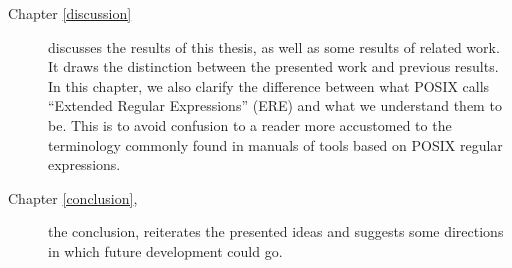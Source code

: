 \begin{description}
   \item[Chapter \ref{discussion}] discusses the results of this thesis, as well
      as some results of related work. It draws the distinction between the
      presented work and previous results. In this chapter, we also clarify the
      difference between what POSIX calls ``Extended Regular Expressions'' (ERE)
      and what we understand them to be. This is to avoid confusion to a reader
      more accustomed to the terminology commonly found in manuals of tools
      based on POSIX regular expressions.

   \item[Chapter \ref{conclusion},] the conclusion, reiterates the presented
      ideas and suggests some directions in which future development could go.

\end{description}


